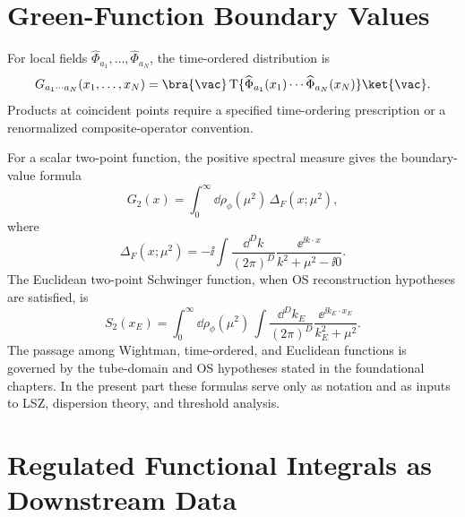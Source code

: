 \section{Green-Function Boundary Values}

\begin{definition}
\label{def:volume-ii-green-function-boundary-values}
For local fields \(\widehat\Phi_{a_1},\ldots,\widehat\Phi_{a_N}\), the
time-ordered distribution is
\[
  G_{a_1\cdots a_N}(x_1,\ldots,x_N)
  =
  \bra{\vac}
  \operatorname T\{
    \widehat\Phi_{a_1}(x_1)\cdots\widehat\Phi_{a_N}(x_N)
  \}
  \ket{\vac}.
\]
Products at coincident points require a specified time-ordering prescription
or a renormalized composite-operator convention.

For a scalar two-point function, the positive spectral measure gives the
boundary-value formula
\[
  G_2(x)
  =
  \int_0^\infty \dd\rho_\phi(\mu^2)\,\Delta_F(x;\mu^2),
\]
where
\[
  \Delta_F(x;\mu^2)
  =
  -\ii\int\frac{\dd^D k}{(2\pi)^D}
  \frac{\ee^{\ii k\cdot x}}{k^2+\mu^2-\ii0}.
\]
The Euclidean two-point Schwinger function, when OS reconstruction hypotheses
are satisfied, is
\[
  S_2(x_E)
  =
  \int_0^\infty \dd\rho_\phi(\mu^2)\,
  \int\frac{\dd^D k_E}{(2\pi)^D}
  \frac{\ee^{\ii k_E\cdot x_E}}{k_E^2+\mu^2}.
\]
The passage among Wightman, time-ordered, and Euclidean functions is governed
by the tube-domain and OS hypotheses stated in the foundational chapters.  In
the present part these formulas serve only as notation and as inputs to LSZ,
dispersion theory, and threshold analysis.
\end{definition}

\section{Regulated Functional Integrals as Downstream Data}

